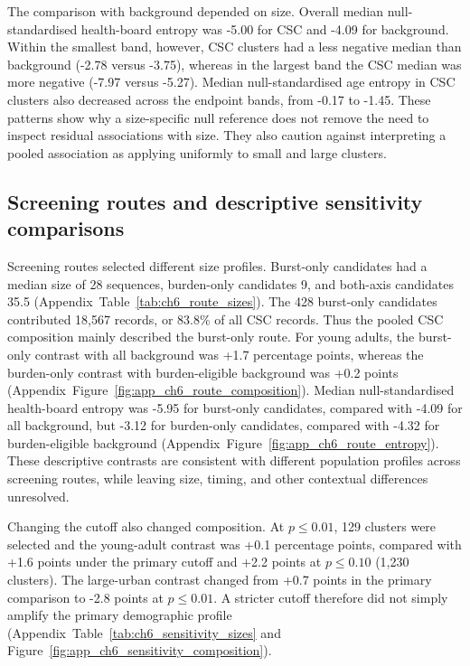 The comparison with background depended on size. Overall median null-standardised health-board entropy was -5.00 for CSC and -4.09 for background. Within the smallest band, however, CSC clusters had a less negative median than background (-2.78 versus -3.75), whereas in the largest band the CSC median was more negative (-7.97 versus -5.27). Median null-standardised age entropy in CSC clusters also decreased across the endpoint bands, from -0.17 to -1.45. These patterns show why a size-specific null reference does not remove the need to inspect residual associations with size. They also caution against interpreting a pooled association as applying uniformly to small and large clusters.

\subsection{Screening routes and descriptive sensitivity comparisons}\label{sec:ch6_descriptive_sensitivity_results}

Screening routes selected different size profiles. Burst-only candidates had a median size of 28 sequences, burden-only candidates 9, and both-axis candidates 35.5 (Appendix~Table~\ref{tab:ch6_route_sizes}). The 428 burst-only candidates contributed 18,567 records, or 83.8\% of all CSC records. Thus the pooled CSC composition mainly described the burst-only route. For young adults, the burst-only contrast with all background was +1.7 percentage points, whereas the burden-only contrast with burden-eligible background was +0.2 points (Appendix~Figure~\ref{fig:app_ch6_route_composition}). Median null-standardised health-board entropy was -5.95 for burst-only candidates, compared with -4.09 for all background, but -3.12 for burden-only candidates, compared with -4.32 for burden-eligible background (Appendix~Figure~\ref{fig:app_ch6_route_entropy}). These descriptive contrasts are consistent with different population profiles across screening routes, while leaving size, timing, and other contextual differences unresolved.

Changing the cutoff also changed composition. At $p\leq0.01$, 129 clusters were selected and the young-adult contrast was +0.1 percentage points, compared with +1.6 points under the primary cutoff and +2.2 points at $p\leq0.10$ (1,230 clusters). The large-urban contrast changed from +0.7 points in the primary comparison to -2.8 points at $p\leq0.01$. A stricter cutoff therefore did not simply amplify the primary demographic profile (Appendix~Table~\ref{tab:ch6_sensitivity_sizes} and Figure~\ref{fig:app_ch6_sensitivity_composition}).

